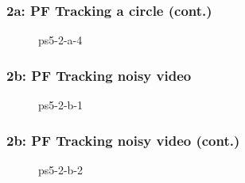 \documentclass[../report.tex]{subfiles}
\begin{document}
    \begin{frame}
        \frametitle{2a: PF Tracking a circle (cont.)}
        \begin{figure}[!htb]
            \centering
            \caption{ps5-2-a-4}
        \end{figure}
    \end{frame}

    \begin{frame}
        \frametitle{2b: PF Tracking noisy video}
        \begin{figure}[!htb]
            \centering
            \caption{ps5-2-b-1}
        \end{figure}
    \end{frame}

    \begin{frame}
        \frametitle{2b: PF Tracking noisy video (cont.)}
        \begin{figure}[!htb]
            \centering
            \caption{ps5-2-b-2}
        \end{figure}
    \end{frame}
\end{document}
